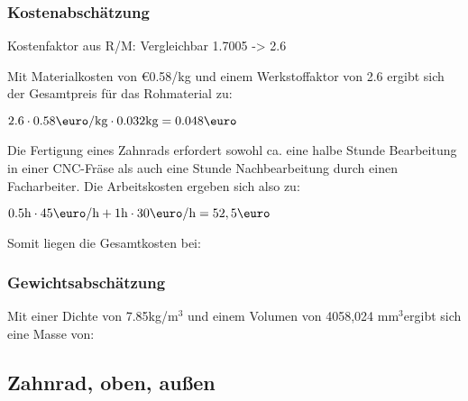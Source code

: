 \documentclass[10pt, a4paper]{article}
\begin{document}
\subsubsection{Kostenabschätzung}
\begin{center}
  Kostenfaktor aus R/M: Vergleichbar 1.7005 -> 2.6 \\  
\end{center}
Mit Materialkosten von \euro0.58/kg und einem Werkstoffaktor von 2.6 ergibt sich der Gesamtpreis für das Rohmaterial zu: 
\begin{center}
    $2.6 \cdot 0.58\text{\euro/kg} \cdot 0.032\text{kg} = 0.048\text{\euro}$
\end{center}
Die Fertigung eines Zahnrads erfordert sowohl ca. eine halbe Stunde Bearbeitung in einer CNC-Fräse als auch eine Stunde Nachbearbeitung durch einen Facharbeiter. Die Arbeitskosten ergeben sich also zu:
\begin{center}
  $0.5\text{h} \cdot 45\text{\euro/h} + 1\text{h} \cdot 30\text{\euro/h} = 52,5\text{\euro}$
\end{center}
Somit liegen die Gesamtkosten bei:
\begin{flushright}
\end{flushright}
\subsubsection{Gewichtsabschätzung}
Mit einer Dichte von 7.85kg/m$^3$ und einem Volumen von 4058,024 mm$^3$ergibt sich eine Masse von:
\begin{flushright}
\end{flushright}

\newpage
\subsection{Zahnrad, oben, außen}
\begin{figure}[h]
  \centering
  \vspace{-10pt}
\end{figure}
\end{document}
